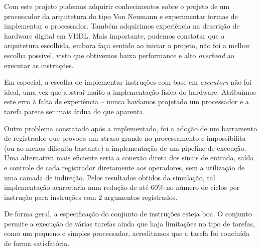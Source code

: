 \documentclass[11pt]{report}
\begin{document}
Com este projeto pudemos adquirir conhecimentos sobre o projeto de um processador da arquitetura do tipo Von Neumann e experimentar formas de implementar o processador. Também adquirimos experiência na descrição de hardware digital em VHDL. Mais importante, pudemos constatar que a arquitetura escolhida, embora faça sentido ao iniciar o projeto, não foi a melhor escolha possível, visto que obtivemos baixa performance e alto \emph{overhead} ao executar as instruções.

Em especial, a escolha de implementar instruções com base em \emph{executors} não foi ideal, uma vez que abstrai muito a implementação física do hardware. Atribuímos este erro à falta de experiência -- nunca havíamos projetado um processador e a tarefa parece ser mais árdua do que aparenta.

Outro problema constatado após a implementado, foi a adoção de um barramento de registrador que provoca um atraso grande no processamento e impossibilita (ou ao menos dificulta bastante) a implementação de um pipeline de execução. Uma alternativa mais eficiente seria a conexão direta dos sinais de entrada, saída e controle de cada registrador diretamente aos operadores, sem a utilização de uma camada de indireção. Pelos resultados obtidos da simulação, tal implementação acarretaria num redução de até 60\% no número de ciclos por instrução para instruções com 2 argumentos registrados.

De forma geral, a especificação do conjunto de instruções esteja boa. O conjunto permite a execução de várias tarefas ainda que haja limitações no tipo de tarefas, como um pequeno e simples processador, acreditamos que a tarefa foi concluída de forma satisfatória.
\end{document}
